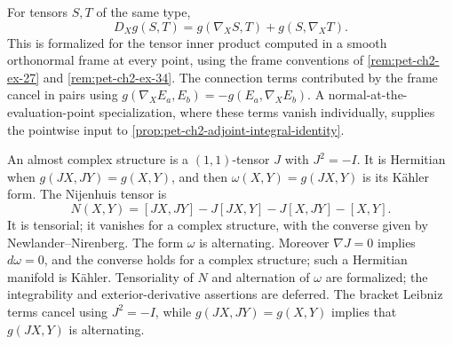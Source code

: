 \begin{remark}
  \label{rem:pet-ch2-ex-32}


  For tensors $S,T$ of the same type,
  \[
    D_Xg(S,T)=g(\nabla_XS,T)+g(S,\nabla_XT).
  \]
  This is formalized for the tensor inner product computed in a smooth
  orthonormal frame at every point, using the frame conventions of
  \cref{rem:pet-ch2-ex-27} and \cref{rem:pet-ch2-ex-34}.
  \sketch
  The connection terms contributed by the
  frame cancel in pairs using
  $g(\nabla_XE_a,E_b)=-g(E_a,\nabla_XE_b)$. A normal-at-the-evaluation-point
  specialization, where these terms vanish individually, supplies the
  pointwise input to
  \cref{prop:pet-ch2-adjoint-integral-identity}.
\end{remark}

\begin{remark}
  \label{rem:pet-ch2-ex-33}


  An almost complex structure is a $(1,1)$-tensor
  $J$ with $J^2=-I$. It is Hermitian when
  $g(JX,JY)=g(X,Y)$, and then
  $\omega(X,Y)=g(JX,Y)$ is its K\"ahler form. The Nijenhuis tensor is
  \[
    N(X,Y)=[JX,JY]-J[JX,Y]-J[X,JY]-[X,Y].
  \]
  It is tensorial; it vanishes for a complex structure, with the converse
  given by Newlander--Nirenberg. The form $\omega$ is alternating. Moreover
  $\nabla J=0$ implies $d\omega=0$, and the converse holds for a complex
  structure; such a Hermitian manifold is K\"ahler.
  Tensoriality of $N$ and alternation of $\omega$ are formalized; the
  integrability and exterior-derivative assertions are deferred.
  \sketch
  The bracket Leibniz terms cancel using $J^2=-I$, while
  $g(JX,JY)=g(X,Y)$ implies that $g(JX,Y)$ is alternating.
\end{remark}

